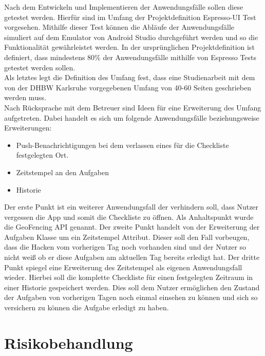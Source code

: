 Nach dem Entwickeln und Implementieren der Anwendungsfälle sollen diese getestet werden. Hierfür sind im Umfang der Projektdefinition Espresso-\ac{UI} Test vorgesehen. Mithilfe dieser Test können die Abläufe der Anwendungsfälle simuliert auf dem Emulator von Android Studio durchgeführt werden und so die Funktionalität gewährleistet werden. In der ursprünglichen Projektdefinition ist definiert, dass mindestens 80\% der Anwendungsfälle mithilfe von Espresso Tests getestet werden sollen.\\
Als letztes legt die Definition des Umfang fest, dass eine Studienarbeit mit dem von der \ac{DHBW} Karlsruhe vorgegebenen Umfang von 40-60 Seiten geschrieben werden muss.\\

Nach Rücksprache mit dem Betreuer sind Ideen für eine Erweiterung des Umfang aufgetreten. Dabei handelt es sich um folgende Anwendungsfälle beziehungsweise Erweiterungen:

\begin{itemize}
	\item Push-Benachrichtigungen bei dem verlassen eines für die Checkliste festgelegten Ort.
	\item Zeitstempel an den Aufgaben
	\item Historie
\end{itemize}

Der erste Punkt ist ein weiterer Anwendungsfall der verhindern soll, dass Nutzer vergessen die App und somit die Checkliste zu öffnen. Als Anhaltspunkt wurde die GeoFencing \ac{API} genannt. Der zweite Punkt handelt von der Erweiterung der Aufgaben Klasse um ein Zeitstempel Attribut. Dieser soll den Fall vorbeugen, dass die Hacken vom vorherigen Tag noch vorhanden sind und der Nutzer so nicht weiß ob er diese Aufgaben am aktuellen Tag bereits erledigt hat. Der dritte Punkt spiegel eine Erweiterung des Zeitstempel als eigenen Anwendungsfall wieder. Hierbei soll die komplette Checkliste für einen festgelegten Zeitraum in einer Historie gespeichert werden. Dies soll dem Nutzer ermöglichen den Zustand der Aufgaben von vorherigen Tagen noch einmal einsehen zu können und sich so versichern zu können die Aufgabe erledigt zu haben.

\section{Risikobehandlung}\label{sec:risiko}

